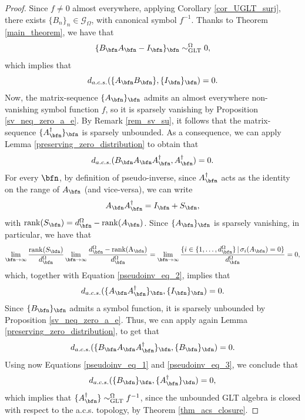 \documentclass{amsart}
\begin{document}
\begin{proof}
Since $f\neq0$ almost everywhere, applying Corollary \ref{cor_UGLT_surj}, there exists $\{B_n\}_n\in\mathcal{G}_\Omega$, with canonical symbol $f^{-1}$. Thanks to Theorem \ref{main_theorem}, we have that
\begin{equation*}
    \{B_\bfn A_\bfn-I_\bfn\}_\bfn\sim_{\mathrm{GLT}}^{\Omega}0,
\end{equation*}
which implies that 
\begin{equation*}
    d_{a.c.s.}(\{A_\bfn B_\bfn\},\{I_\bfn\}_\bfn)=0.
\end{equation*}
Now, the matrix-sequence $\{A_\bfn\}_\bfn$ admits an almost everywhere non-vanishing symbol function $f$, so it is sparsely vanishing by Proposition \ref{sv_neq_zero_a_e}. By Remark \ref{rem_sv_su}, it follows that the matrix-sequence $\{A_\bfn^\dagger\}_\bfn$ is sparsely unbounded. As a consequence, we can apply Lemma \ref{preserving_zero_distribution} to obtain that
\begin{equation}\label{pseudoinv_eq_1}
    d_{a.c.s.}(B_\bfn A_\bfn A_\bfn^\dagger,A_\bfn^\dagger)=0.
\end{equation}
For every $\bfn$, by definition of pseudo-inverse, since $A_\bfn^\dagger$ acts as the identity on the range of $A_\bfn$ (and vice-versa), we can write
\begin{equation}\label{pseudoinv_eq_2}
    A_\bfn A_\bfn^\dagger=I_\bfn+S_\bfn,
\end{equation}
with $\mathrm{rank}(S_\bfn)=d_\bfn^{\Omega}-\mathrm{rank}(A_\bfn)$. Since $\{A_\bfn\}_\bfn$ is sparsely vanishing, in particular, we have that
\begin{equation*}
    \lim\limits_{\bfn\to \infty}\frac{\mathrm{rank}(S_\bfn)}{d_\bfn^{\Omega}}\lim\limits_{\bfn\to \infty}\frac{d_\bfn^{\Omega}-\mathrm{rank(A_\bfn)}}{d_\bfn^{\Omega}}=\lim\limits_{\bfn\to \infty}\frac{\{i\in\{1,\ldots,d_\bfn^{\Omega}\}\,\vert\,\sigma_i(A_\bfn)=0\}}{d_\bfn^{\Omega}}=0,
\end{equation*}
which, together with Equation \eqref{pseudoinv_eq_2}, implies that
\begin{equation*}
    d_{a.c.s.}(\{A_\bfn A_\bfn^{\dagger}\}_\bfn,\{I_\bfn\}_\bfn)=0.
\end{equation*}
Since $\{B_\bfn\}_\bfn$ admits a symbol function, it is sparsely unbounded by Proposition \ref{sv_neq_zero_a_e}. Thus, we can apply again Lemma \ref{preserving_zero_distribution}, to get that
\begin{equation}\label{pseudoinv_eq_3}
    d_{a.c.s.}(\{B_\bfn A_\bfn A_\bfn^\dagger\}_\bfn,\{B_\bfn\}_\bfn)=0.
\end{equation}
Using now Equations \eqref{pseudoinv_eq_1} and \eqref{pseudoinv_eq_3}, we conclude that 
\begin{equation*}
    d_{a.c.s.}(\{B_\bfn\}_\bfn,\{A_\bfn^\dagger\}_\bfn)=0,
\end{equation*}
which implies that $\{A_\bfn^{\dagger}\}\sim_{\mathrm{GLT}}^{\Omega}f^{-1}$, since the unbounded GLT algebra is closed with respect to the a.c.s. topology, by Theorem \ref{thm_acs_closure}.
\end{proof}
\end{document}
